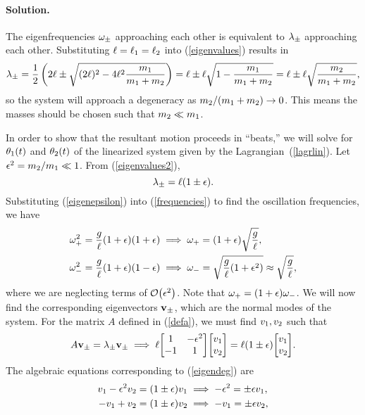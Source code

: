 \documentclass[11pt]{article}
\newcommand{\refeq}[1]{(\ref{#1})}
\newenvironment{solution}
{
    \paragraph{Solution.}
    \ignorespaces
}
{
    \bigskip
}
\begin{document}
\begin{solution}
	The eigenfrequencies $\omega_\pm$ approaching each other is equivalent to $\lambda_\pm$ approaching each other.  Substituting $\ell = \ell_1 = \ell_2$ into \refeq{eigenvalues} results in
	\begin{equation} \label{eigenvalues2}
		\lambda_\pm = \frac{1}{2} \left( 2 \ell \pm \sqrt{(2 \ell)^2 - 4 \ell^2 \frac{m_1}{m_1 + m_2}} \right) = \ell \pm \ell \sqrt{1 - \frac{m_1}{m_1 + m_2}} = \ell \pm \ell \sqrt{\frac{m_2}{m_1 + m_2}},
	\end{equation}
	so the system will approach a degeneracy as $m_2 / (m_1 + m_2) \to 0$.  This means the masses should be chosen such that $m_2 \ll m_1$.

	In order to show that the resultant motion proceeds in ``beats,'' we will solve for $\theta_1(t)$ and $\theta_2(t)$ of the linearized system given by the Lagrangian~\refeq{lagrlin}.  Let $\epsilon^2 = m_2 / m_1 \ll 1$.  From \refeq{eigenvalues2},
	\begin{equation} \label{eigenepsilon}
		\lambda_\pm = \ell (1 \pm \epsilon).
	\end{equation}
	Substituting \refeq{eigenepsilon} into \refeq{frequencies} to find the oscillation frequencies, we have
	\begin{align}
		\omega_+^2 = \frac{g}{\ell} (1 + \epsilon) (1 + \epsilon) &\implies \omega_+ = (1 + \epsilon) \sqrt{\frac{g}{\ell}}, \\
		\omega_-^2 = \frac{g}{\ell} (1 + \epsilon) (1 - \epsilon) &\implies \omega_- = \sqrt{\frac{g}{\ell} (1 + \epsilon^2)} \approx \sqrt{\frac{g}{\ell}},
	\end{align}
	where we are neglecting terms of $\order{\epsilon^2}$.  Note that $\omega_+ = (1 + \epsilon) \omega_-$.  We will now find the corresponding eigenvectors $\mathbf{v}_\pm$, which are the normal modes of the system.  For the matrix $A$ defined in \refeq{defa}, we must find $v_1, v_2$ such that
	\begin{equation} \label{eigendeg}
		A \vvpm = \lmpm \vvpm \implies \ell \mqty[ 1 & -\epsilon^2 \\ -1 & 1 ] \mqty[ \vq \\ \vw ] = \ell (1 \pm \epsilon) \mqty[ \vq \\ \vw ].
	\end{equation}
	The algebraic equations corresponding to \refeq{eigendeg} are
	\begin{align}
		\vq - \epsilon^2 \vw = (1 \pm \epsilon) \vq &\implies -\epsilon^2 = \pm \epsilon \vq, \\
		-\vq + \vw = (1 \pm \epsilon) \vw &\implies -\vq = \pm \epsilon \vw,

\end{align}
\end{solution}
\end{document}
